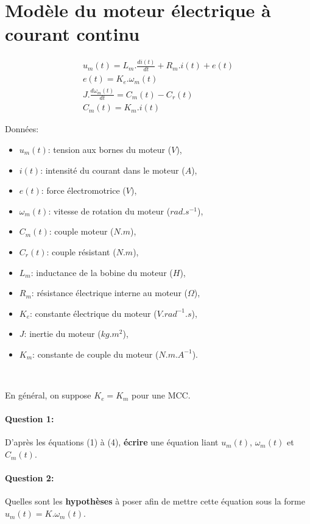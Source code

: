 



\\

\section{Modèle du moteur électrique à courant continu}

\begin{eqnarray}
u_m(t)=L_m.\frac{di(t)}{dt}+R_m.i(t)+e(t) \\
e(t)=K_e.\omega_m(t) \\
J.\frac{d\omega_m(t)}{dt}=C_m(t)-C_r(t) \\
C_m(t)=K_m.i(t)
\end{eqnarray}

Données:
\begin{itemize}
 \item $u_m(t)$: tension aux bornes du moteur ($V$),
 \item $i(t)$: intensité du courant dans le moteur ($A$),
 \item $e(t)$: force électromotrice ($V$),
 \item $\omega_m(t)$: vitesse de rotation du moteur ($rad.s^{-1}$),
 \item $C_m(t)$: couple moteur ($N.m$),
 \item $C_r(t)$: couple résistant ($N.m$),
 \item $L_m$: inductance de la bobine du moteur ($H$),
 \item $R_m$: résistance électrique interne au moteur ($\Omega$),
 \item $K_e$: constante électrique du moteur ($V.rad^{-1}.s$),
 \item $J$: inertie du moteur ($kg.m^2$),
 \item $K_m$: constante de couple du moteur ($N.m.A^{-1}$).
\end{itemize}

~\

En général, on suppose $K_e=K_m$ pour une MCC.

\paragraph{Question 1:} D'après les équations (1) à (4), \textbf{écrire} une équation liant $u_m(t)$, $\omega_m(t)$ et $C_m(t)$.

\paragraph{Question 2:} Quelles sont les \textbf{hypothèses} à poser afin de mettre cette équation sous la forme $u_m(t)=K.\omega_m(t)$.

